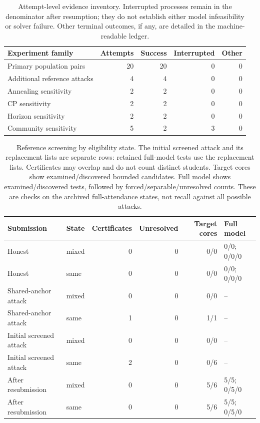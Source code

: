 \begin{table}[tb]\centering\small
\caption{Attempt-level evidence inventory. Interrupted processes remain in the denominator after resumption; they do not establish either model infeasibility or solver failure. Other terminal outcomes, if any, are detailed in the machine-readable ledger.}\label{tab:ledger}
\begin{tabular}{@{}lrrrr@{}}\toprule
Experiment family & Attempts & Success & Interrupted & Other \\ \midrule
Primary population pairs & 20 & 20 & 0 & 0 \\
Additional reference attacks & 4 & 4 & 0 & 0 \\
Annealing sensitivity & 2 & 2 & 0 & 0 \\
CP sensitivity & 2 & 2 & 0 & 0 \\
Horizon sensitivity & 2 & 2 & 0 & 0 \\
Community sensitivity & 5 & 2 & 3 & 0 \\
\bottomrule\end{tabular}\end{table}

\begin{table}[tb]\centering\small
\caption{Reference screening by eligibility state. The initial screened attack and its replacement lists are separate rows: retained full-model tests use the replacement lists. Certificates may overlap and do not count distinct students. Target cores show examined/discovered bounded candidates. Full model shows examined/discovered tests, followed by forced/separable/unresolved counts. These are checks on the archived full-attendance states, not recall against all possible attacks.}\label{tab:screen}
\begin{tabular}{@{}llrrrl@{}}\toprule
Submission & State & Certificates & Unresolved & Target cores & Full model \\ \midrule
Honest & mixed & 0 & 0 & 0/0 & 0/0; 0/0/0 \\
Honest & same & 0 & 0 & 0/0 & 0/0; 0/0/0 \\
Shared-anchor attack & mixed & 0 & 0 & 0/0 & -- \\
Shared-anchor attack & same & 1 & 0 & 1/1 & -- \\
Initial screened attack & mixed & 0 & 0 & 0/0 & -- \\
Initial screened attack & same & 2 & 0 & 0/6 & -- \\
After resubmission & mixed & 0 & 0 & 5/6 & 5/5; 0/5/0 \\
After resubmission & same & 0 & 0 & 5/6 & 5/5; 0/5/0 \\
\bottomrule\end{tabular}\end{table}

